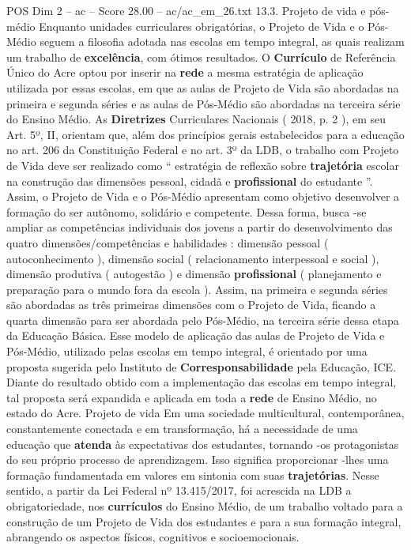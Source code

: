 \begin{textsample}{POS Dim 2 – ac – Score 28.00 – ac/ac\_em\_26.txt}  \label{ex:f2_pos_162}
13.3.
Projeto de vida e pós-médio Enquanto unidades curriculares obrigatórias, o Projeto de Vida e o Pós-Médio seguem a filosofia adotada nas escolas em tempo integral, as quais realizam um trabalho de \textbf{excelência}, com ótimos resultados.
O \textbf{Currículo} de Referência Único do Acre optou por inserir na \textbf{rede} a mesma estratégia de aplicação utilizada por essas escolas, em que as aulas de Projeto de Vida são abordadas na primeira e segunda séries e as aulas de Pós-Médio são abordadas na terceira série do Ensino Médio.
As \textbf{Diretrizes} Curriculares Nacionais ( 2018, p. 2 ), em seu Art. 5º, II, orientam que, além dos princípios gerais estabelecidos para a educação no art. 206 da Constituição Federal e no art. 3º da LDB, o trabalho com Projeto de Vida deve ser realizado como “ estratégia de reflexão sobre \textbf{trajetória} escolar na construção das dimensões pessoal, cidadã e \textbf{profissional} do estudante ”.
Assim, o Projeto de Vida e o Pós-Médio apresentam como objetivo desenvolver a formação do ser autônomo, solidário e competente.
Dessa forma, busca -se ampliar as competências individuais dos jovens a partir do desenvolvimento das quatro dimensões/competências e habilidades : dimensão pessoal ( autoconhecimento ), dimensão social ( relacionamento interpessoal e social ), dimensão produtiva ( autogestão ) e dimensão \textbf{profissional} ( planejamento e preparação para o mundo fora da escola ).
Assim, na primeira e segunda séries são abordadas as três primeiras dimensões com o Projeto de Vida, ficando a quarta dimensão para ser abordada pelo Pós-Médio, na terceira série dessa etapa da Educação Básica.
Esse modelo de aplicação das aulas de Projeto de Vida e Pós-Médio, utilizado pelas escolas em tempo integral, é orientado por uma proposta sugerida pelo Instituto de \textbf{Corresponsabilidade} pela Educação, ICE.
Diante do resultado obtido com a implementação das escolas em tempo integral, tal proposta será expandida e aplicada em toda a \textbf{rede} de Ensino Médio, no estado do Acre.
Projeto de vida Em uma sociedade multicultural, contemporânea, constantemente conectada e em transformação, há a necessidade de uma educação que \textbf{atenda} às expectativas dos estudantes, tornando -os protagonistas do seu próprio processo de aprendizagem.
Isso significa proporcionar -lhes uma formação fundamentada em valores em sintonia com suas \textbf{trajetórias}.
Nesse sentido, a partir da Lei Federal nº 13.415/2017, foi acrescida na LDB a obrigatoriedade, nos \textbf{currículos} do Ensino Médio, de um trabalho voltado para a construção de um Projeto de Vida dos estudantes e para a sua formação integral, abrangendo os aspectos físicos, cognitivos e socioemocionais.

\end{textsample}
